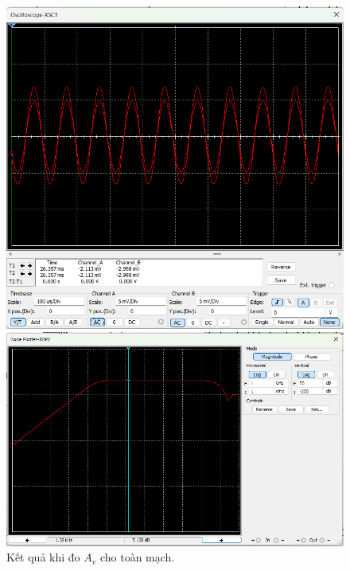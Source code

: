 \begin{figure}[H]
	\centering
	\begin{minipage}{.4\linewidth}
		\includegraphics[width=\linewidth]{./my-chapters/my-images/Question5/d_A_V.png}
	\end{minipage}
	\begin{minipage}{.4\linewidth}
		\includegraphics[width=\linewidth]{./my-chapters/my-images/Question5/d_a_v_ketqua.png}
	\end{minipage}
	\caption{Kết quả khi đo $A_{v}$ cho toàn mạch.}
\end{figure}
